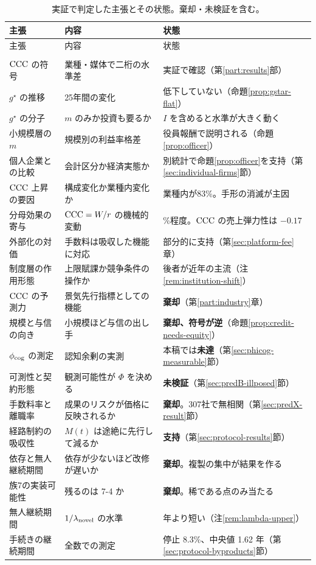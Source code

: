 \begin{longtable}{@{}>{\raggedright\arraybackslash}p{}>{\raggedright\arraybackslash}p{}>{\raggedright\arraybackslash}p{}@{}}
\caption{実証で判定した主張とその状態。棄却・未検証を含む。}\label{tab:empirical-judgments}\\
\toprule
主張 & 内容 & 状態 \\
\midrule
\endfirsthead
\toprule
主張 & 内容 & 状態 \\
\midrule
\endhead
\midrule
\multicolumn{3}{r}{\footnotesize（次頁へ続く）}\\
\endfoot
\bottomrule
\endlastfoot
$\mathrm{CCC}$ の符号 & 業種・媒体で二桁の水準差 & 実証で確認（第\ref{part:results}部） \\
$g^\star$ の推移 & 25年間の変化 & 低下していない（命題\ref{prop:gstar-flat}） \\
$g^\star$ の分子 & $m$ のみか投資も要るか & $I$ を含めると水準が大きく動く \\
小規模層の $m$ & 規模別の利益率格差 & 役員報酬で説明される（命題\ref{prop:officer}） \\
個人企業との比較 & 会計区分か経済実態か & 別統計で命題\ref{prop:officer}を支持（第\ref{sec:individual-firms}節） \\
$\mathrm{CCC}$ 上昇の要因 & 構成変化か業種内変化か & 業種内が83\%。手形の消滅が主因 \\
分母効果の寄与 & $\mathrm{CCC}=W/r$ の機械的変動 & 17\%程度。$\mathrm{CCC}$ の売上弾力性は $-0.17$ \\
外部化の対価 & 手数料は吸収した機能に対応 & 部分的に支持（第\ref{sec:platform-fee}章） \\
制度層の作用形態 & 上限賦課か競争条件の操作か & 後者が近年の主流（注\ref{rem:institution-shift}） \\
\midrule
$\mathrm{CCC}$ の予測力 & 景気先行指標としての機能 & \textbf{棄却}（第\ref{part:industry}章） \\
規模と与信の向き & 小規模ほど与信の出し手 & \textbf{棄却、符号が逆}（命題\ref{prop:credit-needs-equity}） \\
$\phi_{\rm cog}$ の測定 & 認知余剰の実測 & 本稿では\textbf{未達}（第\ref{sec:phicog-measurable}節） \\
可測性と契約形態 & 観測可能性が $\Phi$ を決める & \textbf{未検証}（第\ref{sec:predB-illposed}節） \\
手数料率と離職率 & 成果のリスクが価格に反映されるか & \textbf{棄却}。307社で無相関（第\ref{sec:predX-result}節） \\
経路制約の吸収性 & $M(t)$ は途絶に先行して減るか & \textbf{支持}（第\ref{sec:protocol-results}節） \\
依存と無人継続期間 & 依存が少ないほど改修が遅いか & \textbf{棄却}。複製の集中が結果を作る \\
族7の実装可能性 & 残るのは 7-4 か & \textbf{棄却}。稀である点のみ当たる \\
\midrule
無人継続期間 & $1/\lambda_{\rm novel}$ の水準 & 20 年より短い（注\ref{rem:lambda-upper}） \\
手続きの継続期間 & 全数での測定 & 停止 8.3\%、中央値 1.62 年（第\ref{sec:protocol-byproducts}節） \\
\end{longtable}

